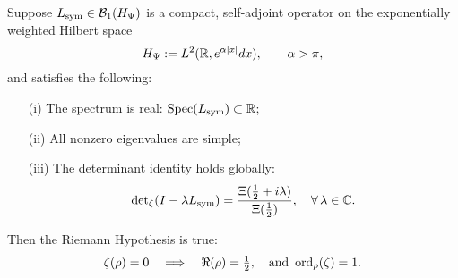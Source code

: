 \begin{theorem}
\label{thm:rh_from_real_simple_spectrum}
Suppose \( L_{\mathrm{sym}} \in \mathcal{B}_1(H_{\Psi}) \) is a compact, self-adjoint operator on the exponentially weighted Hilbert space
\[
H_{\Psi} := L^2(\mathbb{R}, e^{\alpha |x|} dx), \qquad \alpha > \pi,
\]
and satisfies the following:
\begin{itemize}
  \item[\textup{(i)}] The spectrum is real: \( \operatorname{Spec}(L_{\mathrm{sym}}) \subset \mathbb{R} \);
  \item[\textup{(ii)}] All nonzero eigenvalues are simple;
  \item[\textup{(iii)}] The determinant identity holds globally:
  \[
  \det\nolimits_{\zeta}(I - \lambda L_{\mathrm{sym}}) = \frac{\Xi(\tfrac{1}{2} + i\lambda)}{\Xi(\tfrac{1}{2})}, \quad \forall\, \lambda \in \mathbb{C}.
  \]
\end{itemize}

Then the Riemann Hypothesis is true:
\[
\zeta(\rho) = 0 \quad \Longrightarrow \quad \Re(\rho) = \tfrac{1}{2}, \quad \text{and } \operatorname{ord}_\rho(\zeta) = 1.
\]
\end{theorem}

